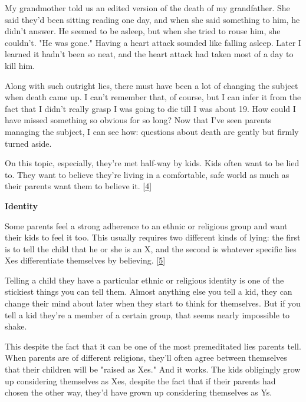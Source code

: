 My grandmother
                  told us an edited version of the death of my grandfather. She
                  said they'd been sitting reading one day, and when she said
                  something to him, he didn't answer. He seemed to be asleep,
                  but when she tried to rouse him, she couldn't. "He was gone."
                  Having a heart attack sounded like falling asleep. Later I
                  learned it hadn't been so neat, and the heart attack had taken
                  most of a day to kill him.

Along with such outright
                  lies, there must have been a lot of changing the subject when
                  death came up. I can't remember that, of course, but I can
                  infer it from the fact that I didn't really grasp I was going
                  to die till I was about 19. How could I have missed something
                  so obvious for so long? Now that I've seen parents managing
                  the subject, I can see how: questions about death are gently
                  but firmly turned aside.

On this topic, especially,
                  they're met half-way by kids. Kids often want to be lied to.
                  They want to believe they're living in a comfortable, safe
                  world as much as their parents want them to believe it.
                  [\href{\#f4n}{4}]


                  \textbf{Identity}

Some parents feel a strong
                  adherence to an ethnic or religious group and want their kids
                  to feel it too. This usually requires two different kinds of
                  lying: the first is to tell the child that he or she is an X,
                  and the second is whatever specific lies Xes differentiate
                  themselves by believing.
                  [\href{\#f5n}{5}]

Telling a child they have a particular ethnic or
                  religious identity is one of the stickiest things you can tell
                  them. Almost anything else you tell a kid, they can change
                  their mind about later when they start to think for
                  themselves. But if you tell a kid they're a member of a
                  certain group, that seems nearly impossible to shake.

This
                  despite the fact that it can be one of the most premeditated
                  lies parents tell. When parents are of different religions,
                  they'll often agree between themselves that their children
                  will be "raised as Xes." And it works. The kids obligingly
                  grow up considering themselves as Xes, despite the fact that
                  if their parents had chosen the other way, they'd have grown
                  up considering themselves as Ys.

